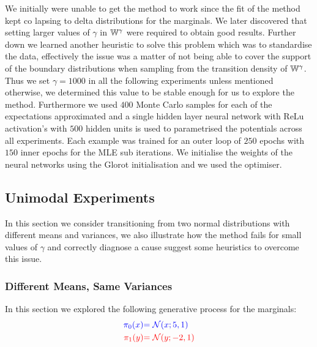 \documentclass[a4paper,12pt,twoside,openright]{report}
\theoremstyle{definition}
\begin{document}
We initially were unable to get the method \cite{pavon2018data} to work since the fit of the method kept co lapsing to delta distributions for the marginals. We later discovered that setting larger values of $\gamma$ in $\mathbb{W}^{\gamma}$ were required to obtain good results. Further down we learned another heuristic to solve this problem which was to standardise the data, effectively the issue was a matter of not being able to cover the support of the boundary distributions when sampling from the transition density of $\mathbb{W}^{\gamma}$. Thus we set $\gamma=1000$ in all the following experiments unless mentioned otherwise, we determined this value to be stable enough for us to explore the method. Furthermore we used $400$ Monte Carlo  samples for each of the expectations approximated and a single hidden layer neural network \citep{lecun2015deep} with ReLu activation's with $500$ hidden units is used to parametrised the potentials across all experiments. Each example was trained for an outer loop of $250$ epochs with $150$ inner epochs for the MLE sub iterations. We initialise the weights of the neural networks using the Glorot initialisation \citep{glorot2010understanding} and we used the \cite{duchi2011adaptive} optimiser.

\subsection{Unimodal Experiments}

In this section we consider transitioning from two normal distributions with different means and variances, we also illustrate how the method fails for small values of $\gamma$ and correctly diagnose a cause suggest some heuristics to overcome this issue. 
\subsubsection{Different Means, Same Variances}

In this section we explored the following generative process for the marginals:
\begin{align*}
\color{blue}{\pi_0(x)} &\color{blue}{= {\mathcal{N}}(x; 5,  1)} \\
    \color{red}{\pi_1(y)} &\color{red}{= {\mathcal{N}}(y; -2, 1)} 
\end{align*}
\end{document}
